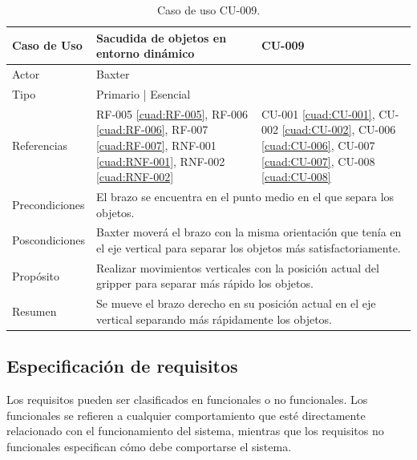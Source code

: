 \begin{table}[H]
	\centering
	\begin{tabular}{|p{2.5cm} | p{6cm} | p{5cm} |}
		\hline
		\textbf{Caso de Uso} & Sacudida de objetos en entorno dinámico & \textbf{CU-009} \\
		\hline 
		Actor & \multicolumn{2}{|l|}{Baxter} \\
		\hline
		Tipo & \multicolumn{2}{|l|}{Primario | Esencial} \\
		\hline
		Referencias & RF-005 \ref{cuad:RF-005}, RF-006 \ref{cuad:RF-006}, RF-007 \ref{cuad:RF-007}, RNF-001 \ref{cuad:RNF-001}, RNF-002 \ref{cuad:RNF-002} & CU-001 \ref{cuad:CU-001}, CU-002 \ref{cuad:CU-002}, CU-006 \ref{cuad:CU-006}, CU-007 \ref{cuad:CU-007}, CU-008 \ref{cuad:CU-008} \\
		\hline
		Precondiciones & \multicolumn{2}{|l|}{\parbox{30em}{El brazo se encuentra en el punto medio en el que separa los objetos.}} \\
		\hline
		Poscondiciones & \multicolumn{2}{|l|}{\parbox{30em}{Baxter moverá el brazo con la misma orientación que tenía en el eje vertical para separar los objetos más satisfactoriamente.}} \\
		\hline
		Propósito & \multicolumn{2}{|l|}{\parbox{30em}{Realizar movimientos verticales con la posición actual del gripper para separar más rápido los objetos.}} \\
		\hline
		Resumen & \multicolumn{2}{|l|}{\parbox{30em}{Se mueve el brazo derecho en su posición actual en el eje vertical separando más rápidamente los objetos.}} \\
		\hline
		
	\end{tabular}
	\caption{Caso de uso CU-009.}
	\label{cuad:CU-009}
\end{table}

\subsection{Especificación de requisitos}
\noindent Los requisitos pueden ser clasificados en funcionales o no funcionales. Los funcionales se refieren a cualquier comportamiento que esté directamente relacionado con el funcionamiento del sistema, mientras que los requisitos no funcionales especifican cómo debe comportarse el sistema. \\

